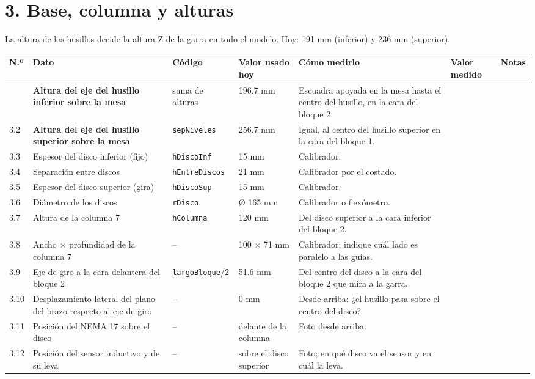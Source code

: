 \documentclass[10pt]{article}
\makeatletter
\newenvironment{medidas}{%
  \small
  \begin{longtable}{@{}L{0.9cm}L{5.0cm}L{2.3cm}L{2.7cm}L{6.4cm}>{\columncolor{fondo}}L{3.1cm}L{2.4cm}@{}}
  \toprule
  \textbf{N.º} & \textbf{Dato} & \textbf{Código} & \textbf{Valor usado hoy} & \textbf{Cómo medirlo} & \textbf{Valor medido} & \textbf{Notas}\\
  \midrule\endhead
  \bottomrule\endfoot}{\end{longtable}}
\newcommand{\cod}[1]{\texttt{\footnotesize #1}}
\makeatother
\begin{document}
\section{3. Base, columna y alturas}
La altura de los husillos decide la altura Z de la garra en todo el modelo. Hoy: 191 mm (inferior) y 236 mm (superior).
\begin{medidas}
3.1 & \textbf{Altura del eje del husillo inferior sobre la mesa} & suma de alturas & 196.7 mm & Escuadra apoyada en la mesa hasta el centro del husillo, en la cara del bloque 2. & & \\
3.2 & \textbf{Altura del eje del husillo superior sobre la mesa} & \cod{sepNiveles} & 256.7 mm & Igual, al centro del husillo superior en la cara del bloque 1. & & \\
3.3 & Espesor del disco inferior (fijo) & \cod{hDiscoInf} & 15 mm & Calibrador. & & \\
3.4 & Separación entre discos & \cod{hEntreDiscos} & 21 mm & Calibrador por el costado. & & \\
3.5 & Espesor del disco superior (gira) & \cod{hDiscoSup} & 15 mm & Calibrador. & & \\
3.6 & Diámetro de los discos & \cod{rDisco} & Ø 165 mm & Calibrador o flexómetro. & & \\
3.7 & Altura de la columna 7 & \cod{hColumna} & 120 mm & Del disco superior a la cara inferior del bloque 2. & & \\
3.8 & Ancho × profundidad de la columna 7 & -- & 100 × 71 mm & Calibrador; indique cuál lado es paralelo a las guías. & & \\
3.9 & Eje de giro a la cara delantera del bloque 2 & \cod{largoBloque}/2 & 51.6 mm & Del centro del disco a la cara del bloque 2 que mira a la garra. & & \\
3.10 & Desplazamiento lateral del plano del brazo respecto al eje de giro & -- & 0 mm & Desde arriba: ¿el husillo pasa sobre el centro del disco? & & \\
3.11 & Posición del NEMA 17 sobre el disco & -- & delante de la columna & Foto desde arriba. & & \\
3.12 & Posición del sensor inductivo y de su leva & -- & sobre el disco superior & Foto; en qué disco va el sensor y en cuál la leva. & & \\
\end{medidas}

\end{document}
